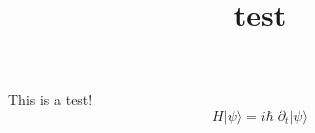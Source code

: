 \documentclass{article}
\title{test}
\begin{document}
This is a test!
\begin{equation}
  H|\psi \rangle = i\hbar\; \partial_t |\psi\rangle
\end{equation}
\end{document}
